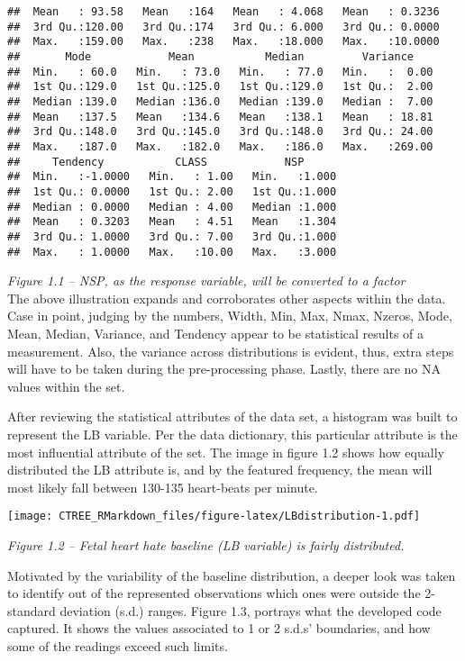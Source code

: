 \documentclass[
]{article}
\begin{document}
\begin{verbatim}
##  Mean   : 93.58   Mean   :164   Mean   : 4.068   Mean   : 0.3236  
##  3rd Qu.:120.00   3rd Qu.:174   3rd Qu.: 6.000   3rd Qu.: 0.0000  
##  Max.   :159.00   Max.   :238   Max.   :18.000   Max.   :10.0000  
##       Mode            Mean           Median         Variance     
##  Min.   : 60.0   Min.   : 73.0   Min.   : 77.0   Min.   :  0.00  
##  1st Qu.:129.0   1st Qu.:125.0   1st Qu.:129.0   1st Qu.:  2.00  
##  Median :139.0   Median :136.0   Median :139.0   Median :  7.00  
##  Mean   :137.5   Mean   :134.6   Mean   :138.1   Mean   : 18.81  
##  3rd Qu.:148.0   3rd Qu.:145.0   3rd Qu.:148.0   3rd Qu.: 24.00  
##  Max.   :187.0   Max.   :182.0   Max.   :186.0   Max.   :269.00  
##     Tendency           CLASS            NSP       
##  Min.   :-1.0000   Min.   : 1.00   Min.   :1.000  
##  1st Qu.: 0.0000   1st Qu.: 2.00   1st Qu.:1.000  
##  Median : 0.0000   Median : 4.00   Median :1.000  
##  Mean   : 0.3203   Mean   : 4.51   Mean   :1.304  
##  3rd Qu.: 1.0000   3rd Qu.: 7.00   3rd Qu.:1.000  
##  Max.   : 1.0000   Max.   :10.00   Max.   :3.000
\end{verbatim}

\emph{Figure 1.1 -- NSP, as the response variable, will be converted to
a factor}\\
The above illustration expands and corroborates other aspects within the
data. Case in point, judging by the numbers, Width, Min, Max, Nmax,
Nzeros, Mode, Mean, Median, Variance, and Tendency appear to be
statistical results of a measurement. Also, the variance across
distributions is evident, thus, extra steps will have to be taken during
the pre-processing phase. Lastly, there are no NA values within the set.

After reviewing the statistical attributes of the data set, a histogram
was built to represent the LB variable. Per the data dictionary, this
particular attribute is the most influential attribute of the set. The
image in figure 1.2 shows how equally distributed the LB attribute is,
and by the featured frequency, the mean will most likely fall between
130-135 heart-beats per minute.

\texttt{[image: CTREE\_RMarkdown\_files/figure-latex/LBdistribution-1.pdf]}

\emph{Figure 1.2 -- Fetal heart hate baseline (LB variable) is fairly
distributed.}

Motivated by the variability of the baseline distribution, a deeper look
was taken to identify out of the represented observations which ones
were outside the 2-standard deviation (s.d.) ranges. Figure 1.3,
portrays what the developed code captured. It shows the values
associated to 1 or 2 s.d.s' boundaries, and how some of the readings
exceed such limits.
\end{document}
